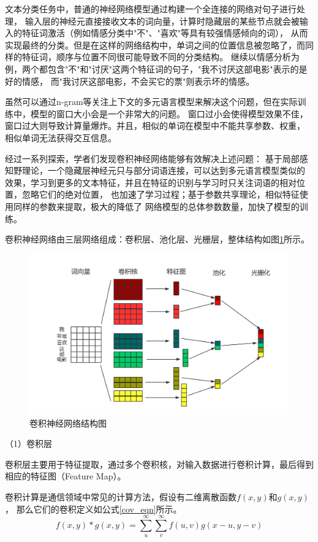 文本分类任务中，普通的神经网络模型通过构建一个全连接的网络对句子进行处理，
输入层的神经元直接接收文本的词向量，计算时隐藏层的某些节点就会被输入的特征词激活（例如情感分类中"不"、"喜欢"等具有较强情感倾向的词），
从而实现最终的分类。但是在这样的网络结构中，单词之间的位置信息被忽略了，而同样的特征词，顺序与位置不同很可能导致不同的分类结构。
继续以情感分析为例，两个都包含"不"和"讨厌"这两个特征词的句子，"我不讨厌这部电影"表示的是好的情感，
而"我讨厌这部电影，不会买它的票"则表示坏的情感。

虽然可以通过n-gram等关注上下文的多元语言模型来解决这个问题，但在实际训练中，模型的窗口大小会是一个非常大的问题。
窗口过小会使得模型效果不佳，窗口过大则导致计算量爆炸。并且，相似的单词在模型中不能共享参数、权重，
相似单词无法获得交互信息。

经过一系列探索，学者们发现卷积神经网络能够有效解决上述问题：
基于局部感知野理论，一个隐藏层神经元只与部分词语连接，可以达到多元语言模型类似的
效果，学习到更多的文本特征，并且在特征的识别与学习时只关注词语的相对位置，忽略它们的绝对位置，
也加速了学习过程；基于参数共享理论，相似特征使用同样的参数来提取，极大的降低了
网络模型的总体参数数量，加快了模型的训练。

卷积神经网络由三层网络组成：卷积层、池化层、光栅层，整体结构如图\ref{Text_CNN}所示。
\begin{figure}[h]
    \includegraphics[scale=0.4]{picture/Text_CNN.png}
    \caption{卷积神经网络结构图}
    \label{Text_CNN}
\end{figure}

（1）卷积层

卷积层主要用于特征提取，通过多个卷积核，对输入数据进行卷积计算，最后得到相应的特征图（Feature Map）。

卷积计算是通信领域中常见的计算方法，假设有二维离散函数$f\left ( x,y \right )$和$g\left ( x,y \right )$，
那么它们的卷积定义如公式\ref{cov_eqn}所示。
\begin{equation}
    f\left ( x,y \right )\ast g\left ( x,y \right )=\sum_{u}^{\infty }\sum_{v}^{\infty }f\left ( u,v \right )
g\left ( x-u,y-v \right )
    \label{cov_eqn}
\end{equation}

